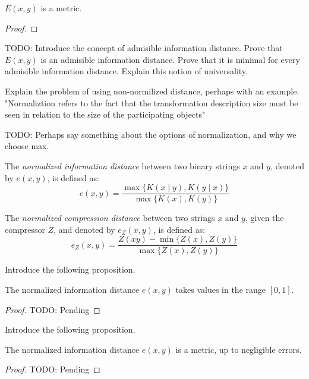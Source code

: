 \begin{proposition}
{\color{red} $E(x, y)$ is a metric.}
\end{proposition}
\begin{proof}
\end{proof}

{\color{red} TODO: Introduce the concept of admisible information distance. Prove that $E(x, y)$ is an admisible information distance. Prove that it is minimal for every admisible information distance. Explain this notion of universality.}

{\color{red} Explain the problem of using non-normilized distance, perhaps with an example. "Normaliztion refers to the fact that the transformation description size must be seen in relation to the size of the participating objects"}

{\color{red} TODO: Perhaps say something about the options of normalization, and why we choose max.}

\begin{definition}
The \emph{normalized information distance} between two binary strings $x$ and $y$, denoted by $e(x, y)$, is defined as:
\[
e(x, y) = \frac{\max\{ K(x \mid y), K(y \mid x) \}}{\max \{ K(x), K(y) \} }
\]
\end{definition}

\begin{definition}
The \emph{normalized compression distance} between two strings $x$ and $y$, given the compressor $Z$, and denoted by $e_Z(x, y)$, is defined as:
\[
e_Z(x, y) = \frac{ Z(xy) - \min\{ Z(x), Z(y) \}}{\max \{ Z(x), Z(y) \} }
\]
\end{definition}

{\color{red} Introduce the following proposition.}

\begin{proposition}
\label{prop:ncd_between_zero_and_one}
The normalized information distance $e(x, y)$ takes values in the range $[0, 1]$.
\end{proposition}
\begin{proof}
{\color{red} TODO: Pending}
\end{proof}

{\color{red} Introduce the following proposition.}

\begin{proposition}
The normalized information distance $e(x, y)$ is a metric, up to negligible errors.
\end{proposition}
\begin{proof}
{\color{red} TODO: Pending}
\end{proof}

